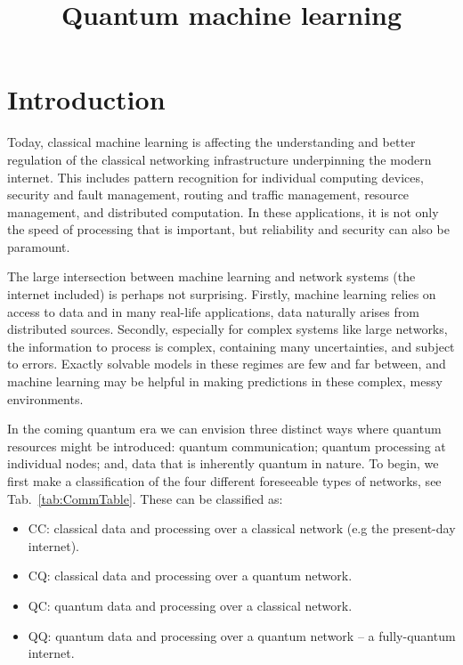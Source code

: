 \documentclass[twocolumn, aps, rmp, amsmath, amssymb, nofootinbib, superscriptaddress, longbibliography, floatfix, table-of-contents, eqsecnum]{revtex4}
\title{Quantum machine learning}\index{Quantum machine learning}
\begin{document}
\maketitle

\tableofcontents 

\section{Introduction}

Today, classical machine learning is affecting the understanding and better regulation of the classical networking infrastructure underpinning the modern internet. This includes pattern recognition for individual computing devices, security and fault management, routing and traffic management, resource management, and distributed computation. In these applications, it is not only the speed of processing that is important, but reliability and security can also be paramount.

The large intersection between machine learning and network systems (the internet included) is perhaps not surprising. Firstly, machine learning relies on access to data and in many real-life applications, data naturally arises from distributed sources. Secondly, especially for complex systems like large networks, the information to process is complex, containing many uncertainties, and subject to errors. Exactly solvable models in these regimes are few and far between, and machine learning may be helpful in making predictions in these complex, messy environments.

In the coming quantum era we can envision three distinct ways where quantum resources might be introduced: quantum communication; quantum processing at individual nodes; and, data that is inherently quantum in nature. To begin, we first make a classification of the four different foreseeable types of networks, see Tab.~\ref{tab:CommTable}. These can be classified as:

\begin{itemize}
\item CC: classical data and processing over a classical network (e.g the present-day internet).
\item CQ: classical data and processing over a quantum network.
\item QC: quantum data and processing over a classical network.
\item QQ: quantum data and processing over a quantum network -- a fully-quantum internet.
\end{itemize}
\end{document}
